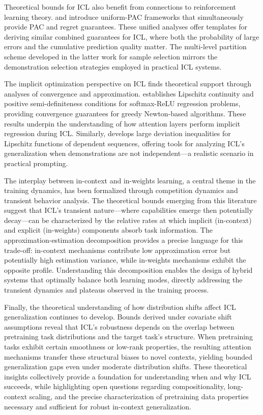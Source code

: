 \documentclass[11pt]{article}
\begin{document}
Theoretical bounds for ICL also benefit from connections to reinforcement learning theory. \cite{ref82} and \cite{ref83} introduce uniform-PAC frameworks that simultaneously provide PAC and regret guarantees. These unified analyses offer templates for deriving similar combined guarantees for ICL, where both the probability of large errors and the cumulative prediction quality matter. The multi-level partition scheme developed in the latter work for sample selection mirrors the demonstration selection strategies employed in practical ICL systems.

The implicit optimization perspective on ICL finds theoretical support through analyses of convergence and approximation. \cite{ref84} establishes Lipschitz continuity and positive semi-definiteness conditions for softmax-ReLU regression problems, providing convergence guarantees for greedy Newton-based algorithms. These results underpin the understanding of how attention layers perform implicit regression during ICL. Similarly, \cite{ref85} develops large deviation inequalities for Lipschitz functions of dependent sequences, offering tools for analyzing ICL's generalization when demonstrations are not independent---a realistic scenario in practical prompting.

The interplay between in-context and in-weights learning, a central theme in the training dynamics, has been formalized through competition dynamics and transient behavior analysis. The theoretical bounds emerging from this literature suggest that ICL's transient nature---where capabilities emerge then potentially decay---can be characterized by the relative rates at which implicit (in-context) and explicit (in-weights) components absorb task information. The approximation-estimation decomposition provides a precise language for this trade-off: in-context mechanisms contribute low approximation error but potentially high estimation variance, while in-weights mechanisms exhibit the opposite profile. Understanding this decomposition enables the design of hybrid systems that optimally balance both learning modes, directly addressing the transient dynamics and plateaus observed in the training process.

Finally, the theoretical understanding of how distribution shifts affect ICL generalization continues to develop. Bounds derived under covariate shift assumptions reveal that ICL's robustness depends on the overlap between pretraining task distributions and the target task's structure. When pretraining tasks exhibit certain smoothness or low-rank properties, the resulting attention mechanisms transfer these structural biases to novel contexts, yielding bounded generalization gaps even under moderate distribution shifts. These theoretical insights collectively provide a foundation for understanding when and why ICL succeeds, while highlighting open questions regarding compositionality, long-context scaling, and the precise characterization of pretraining data properties necessary and sufficient for robust in-context generalization.
\end{document}
